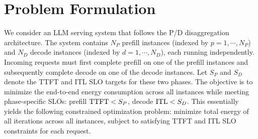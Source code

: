 \section{Problem Formulation} 
\label{sec:formulation}




We consider an LLM serving system that follows the P/D disaggregation architecture.
The system contains $N_P$ prefill instances (indexed by $p=1,\cdots,N_P$) and $N_D$ decode instances (indexed by $d=1,\cdots,N_D$), each running independently. 
Incoming requests must first complete prefill on one of the prefill instances and subsequently complete decode on one of the decode instances. Let $S_P$ and $S_D$ denote the TTFT and ITL SLO targets for these two phases.
The objective is to minimize the end-to-end energy consumption across all instances while meeting phase-specific SLOs: prefill $\operatorname{TTFT}<S_P$, decode $\operatorname{ITL}<S_D$.
This essentially yields the following constrained optimization problem: minimize total energy of all iterations across all instances, subject to satisfying TTFT and ITL SLO constraints for each request.



